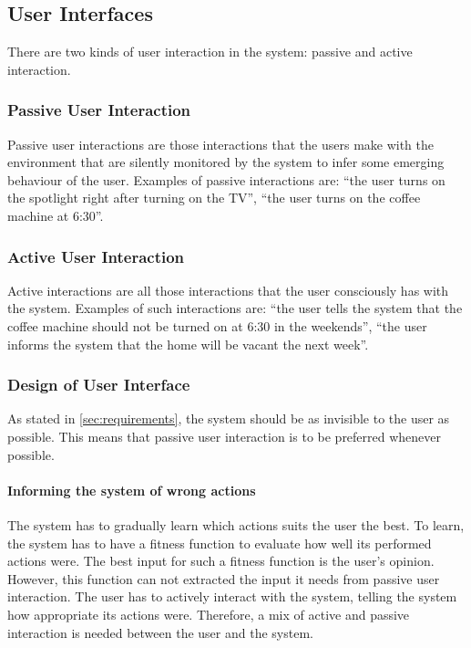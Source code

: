 \subsection{User Interfaces}
There are two kinds of user interaction in the system: passive and active interaction.

\subsubsection{Passive User Interaction}
Passive user interactions are those interactions that the users make with the environment that are silently monitored by the system to infer some emerging behaviour of the user. Examples of passive interactions are: \enquote{the user turns on the spotlight right after turning on the TV}, \enquote{the user turns on the coffee machine at 6:30}.

\subsubsection{Active User Interaction}
Active interactions are all those interactions that the user consciously has with the system. Examples of such interactions are: \enquote{the user tells the system that the coffee machine should not be turned on at 6:30 in the weekends}, \enquote{the user informs the system that the home will be vacant the next week}.

\subsubsection{Design of User Interface}
As stated in \cref{sec:requirements}, the system should be as invisible to the user as possible. This means that passive user interaction is to be preferred whenever possible. 

\paragraph{Informing the system of wrong actions}

The system has to gradually learn which actions suits the user the best. To learn, the system has to have a fitness function to evaluate how well its performed actions were. The best input for such a fitness function is the user's opinion. However, this function can not extracted the input it needs from passive user interaction. The user has to actively interact with the system, telling the system how appropriate its actions were. Therefore, a mix of active and passive interaction is needed between the user and the system.

